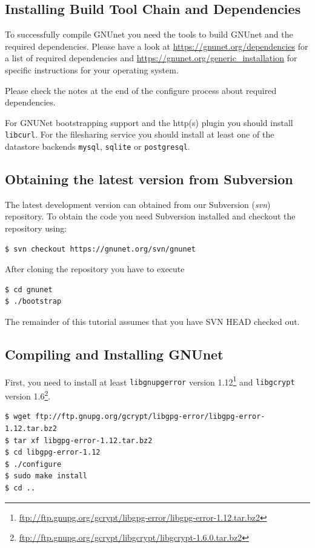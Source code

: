 \documentclass[10pt]{article}
\begin{document}
\subsection{Installing Build Tool Chain and Dependencies}
To successfully compile GNUnet you need the tools to build GNUnet and the required dependencies.
Please have a look at \url{https://gnunet.org/dependencies} for a list of required dependencies
and \url{https://gnunet.org/generic_installation} for specific instructions for your operating system.

Please check the notes at the end of the configure process about required dependencies.

For GNUNet bootstrapping support and the http(s) plugin you should install \texttt{libcurl}.
For the filesharing service you should install at least one of the datastore backends \texttt{mysql},
\texttt{sqlite} or \texttt{postgresql}.

\subsection{Obtaining the latest version from Subversion}
The latest development version can obtained from our Subversion (\textit{svn}) repository. To obtain
the code you need Subversion installed and checkout the repository using:
\lstset{language=bash}
\begin{lstlisting}
$ svn checkout https://gnunet.org/svn/gnunet
\end{lstlisting}
After cloning the repository you have to execute
\lstset{language=bash}
\begin{lstlisting}
$ cd gnunet
$ ./bootstrap
\end{lstlisting}

The remainder of this tutorial assumes that you have SVN HEAD checked out.

\subsection{Compiling and Installing GNUnet}

First, you need to install at least {\tt libgnupgerror} version
1.12\footnote{\url{ftp://ftp.gnupg.org/gcrypt/libgpg-error/libgpg-error-1.12.tar.bz2}}
and {\tt libgcrypt} version
1.6\footnote{\url{ftp://ftp.gnupg.org/gcrypt/libgcrypt/libgcrypt-1.6.0.tar.bz2}}.

\lstset{language=bash}
\begin{lstlisting}
$ wget ftp://ftp.gnupg.org/gcrypt/libgpg-error/libgpg-error-1.12.tar.bz2
$ tar xf libgpg-error-1.12.tar.bz2
$ cd libgpg-error-1.12
$ ./configure
$ sudo make install
$ cd ..
\end{lstlisting}
\end{document}
